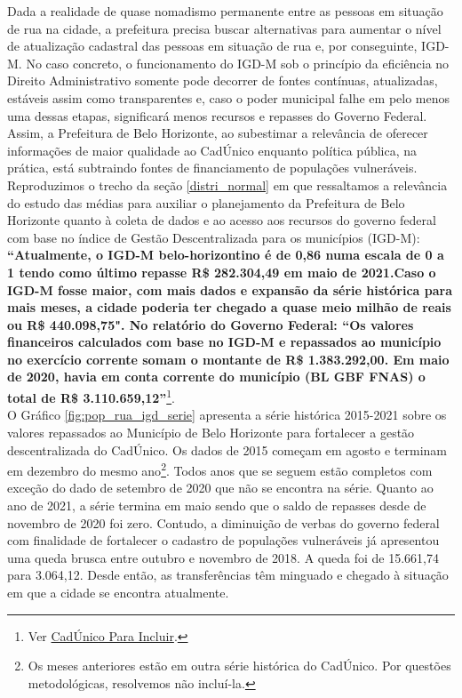 \documentclass[12pt]{article}
\begin{document}
Dada a realidade de quase nomadismo permanente entre as pessoas em situação de rua na cidade, a prefeitura precisa buscar alternativas para aumentar o nível de atualização cadastral das pessoas em situação de rua e, por conseguinte, IGD-M. No caso concreto, o funcionamento do IGD-M sob o princípio da eficiência no Direito Administrativo somente pode decorrer de fontes contínuas, atualizadas, estáveis assim como transparentes e, caso o poder municipal falhe em pelo menos uma dessas etapas, significará menos recursos e repasses do Governo Federal. Assim, a Prefeitura de Belo Horizonte, ao subestimar a relevância de oferecer informações de maior qualidade ao CadÚnico enquanto política pública, na prática, está subtraindo fontes de financiamento de populações vulneráveis.\\

Reproduzimos o trecho da seção \ref{distri_normal} em que ressaltamos a relevância do estudo das médias para auxiliar o planejamento da Prefeitura de Belo Horizonte quanto à coleta de dados e ao acesso aos recursos do governo federal com base no índice de Gestão Descentralizada para os municípios (IGD-M): \textbf{``Atualmente, o IGD-M belo-horizontino é de 0,86 numa escala de 0 a 1 tendo como último repasse R\$ 282.304,49 em maio de 2021.Caso o IGD-M fosse maior, com mais dados e expansão da série histórica para mais meses, a cidade poderia ter chegado a quase meio milhão de reais ou R\$ 440.098,75". No relatório do Governo Federal: ``Os valores financeiros calculados com base no IGD-M e repassados ao município no exercício corrente somam o montante de R\$ 1.383.292,00. Em maio de 2020, havia em conta corrente do município (BL GBF FNAS) o total de R\$ 3.110.659,12''}\footnote{Ver \href{https://aplicacoes.mds.gov.br/sagirmps/bolsafamilia/relatorio-resumido.html}{CadÚnico Para Incluir}.}.\\

O Gráfico \ref{fig:pop_rua_igd_serie} apresenta a série histórica 2015-2021 sobre os valores repassados ao Município de Belo Horizonte para fortalecer a gestão descentralizada do CadÚnico. Os dados de 2015 começam em agosto e terminam em dezembro do mesmo ano\footnote{Os meses anteriores estão em outra série histórica do CadÚnico. Por questões metodológicas, resolvemos não incluí-la.}. Todos anos que se seguem estão completos com exceção do dado de setembro de 2020 que não se encontra na série. Quanto ao ano de 2021, a série termina em maio sendo que o saldo de repasses desde de novembro de 2020 foi zero. Contudo, a diminuição de verbas do governo federal com finalidade de fortalecer o cadastro de populações vulneráveis já apresentou uma queda brusca entre outubro e novembro de 2018. A queda foi de 15.661,74 para 3.064,12. Desde então, as transferências têm minguado e chegado à situação em que a cidade se encontra atualmente.\\
\end{document}
